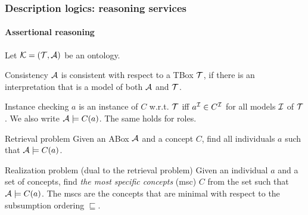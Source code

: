 \documentclass{beamer}
\newcommand{\K}{{\cal{K}}}
\newcommand{\T}{{\cal{T}}}
\newcommand{\I}{{\cal{I}}}
\newcommand{\A}{{\cal{A}}}
\begin{document}
\begin{frame}
\frametitle{Description logics: reasoning services}
\framesubtitle{Assertional reasoning}
\footnotesize
Let $\K=(\T,\A)$ be an ontology. 
\begin{block}{Consistency}
\footnotesize
$\A$ is consistent with respect to a TBox $\T$, if there is an interpretation that is a model of both $\A$ and $\T$.
\end{block}
\begin{block}{Instance checking}
\footnotesize
$a$ is an instance of $C$ w.r.t. $\T$ iff $a^\I \in C^\I$ for all models $\I$ of $\T$. We also write $\A\models C(a)$. The same holds for roles.
\end{block}
\begin{block}{Retrieval problem}
\footnotesize
Given an ABox $\A$ and a concept $C$, find all individuals $a$ such that $\A\models C(a)$.
\end{block}
\begin{block}{Realization problem (dual to the retrieval problem)}
\footnotesize
 Given an individual $a$ and a set of concepts, find {\em the most specific concepts} (msc) $C$ from the set such that $\A \models C(a)$. The mscs are the concepts that are minimal with respect to the subsumption ordering $\sqsubseteq$.
\end{block}
\end{frame}
\end{document}
